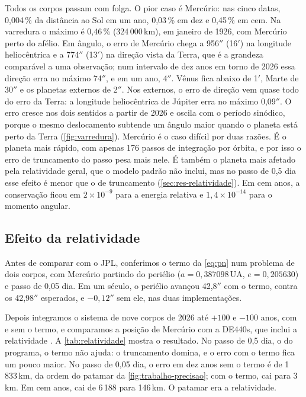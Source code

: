Todos os corpos passam com folga. O pior caso é Mercúrio: nas cinco datas, 0,004\,\% da distância ao Sol em um ano, 0,03\,\% em dez e 0,45\,\% em cem. Na varredura o máximo é 0,46\,\% (324\,000\,km), em janeiro de 1926, com Mercúrio perto do afélio. Em ângulo, o erro de Mercúrio chega a 956$''$ (16$'$) na longitude heliocêntrica e a 774$''$ (13$'$) na direção vista da Terra, que é a grandeza comparável a uma observação; num intervalo de dez anos em torno de 2026 essa direção erra no máximo 74$''$, e em um ano, 4$''$. Vênus fica abaixo de 1$'$, Marte de 30$''$ e os planetas externos de 2$''$. Nos externos, o erro de direção vem quase todo do erro da Terra: a longitude heliocêntrica de Júpiter erra no máximo 0,09$''$. O erro cresce nos dois sentidos a partir de 2026 e oscila com o período sinódico, porque o mesmo deslocamento subtende um ângulo maior quando o planeta está perto da Terra (\autoref{fig:varredura}). Mercúrio é o caso difícil por duas razões. É o planeta mais rápido, com apenas 176 passos de integração por órbita, e por isso o erro de truncamento do passo pesa mais nele. É também o planeta mais afetado pela relatividade geral, que o modelo padrão não inclui, mas no passo de 0,5 dia esse efeito é menor que o de truncamento (\autoref{sec:res-relatividade}). Em cem anos, a conservação ficou em $2\times10^{-9}$ para a energia relativa e $1{,}4\times10^{-14}$ para o momento angular.

\subsection{Efeito da relatividade}\label{sec:res-relatividade}

Antes de comparar com o JPL, conferimos o termo da \autoref{eq:pn} num problema de dois corpos, com Mercúrio partindo do periélio ($a = 0{,}387098$\,UA, $e = 0{,}205630$) e passo de 0,05 dia. Em um século, o periélio avançou 42,8$''$ com o termo, contra os 42,98$''$ esperados, e $-0{,}12''$ sem ele, nas duas implementações.

Depois integramos o sistema de nove corpos de 2026 até $+100$ e $-100$ anos, com e sem o termo, e comparamos a posição de Mercúrio com a DE440s, que inclui a relatividade \cite{park2021}. A \autoref{tab:relatividade} mostra o resultado. No passo de 0,5 dia, o do programa, o termo não ajuda: o truncamento domina, e o erro com o termo fica um pouco maior. No passo de 0,05 dia, o erro em dez anos sem o termo é de 1\,833\,km, da ordem do patamar da \autoref{fig:trabalho-precisao}; com o termo, cai para 3\,km. Em cem anos, cai de 6\,188 para 146\,km. O patamar era a relatividade.

